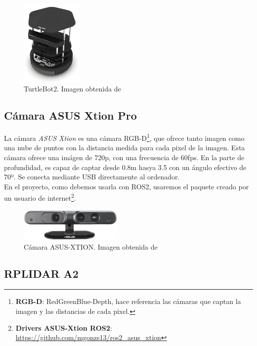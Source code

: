 \begin{figure} [H]
    \begin{center}
        \includegraphics[width=3cm]{figs/c3/turtlebot2_body.jpg}
    \end{center}
    \caption[TurtleBot2]{TurtleBot2. Imagen obtenida de \cite{turtlebot_2_structure}}
    \label{fig:turtlebot_2_structure}
\end{figure}

\subsection{Cámara ASUS Xtion Pro}
\label{subsec:asus_xtion}
La cámara \textit{ASUS Xtion} es una cámara RGB-D\footnote{\textbf{RGB-D}: RedGreenBlue-Depth, hace referencia las cámaras que captan la imagen y
las distancias de cada pixel.}, que ofrece tanto imagen como una nube de puntos con la distancia medida para cada pixel de la imagen.
Esta cámara ofrece una imágen de 720p, con una frecuencia de 60fps. En la parte de profundidad, es capaz de captar desde 0.8m hasya 3.5 con un
ángulo efectivo de 70º. Se conecta mediante USB directamente al ordenador.\\
En el proyecto, como debemos usarla con ROS2, usaremos el paquete creado por un usuario de
internet\footnote{\textbf{Drivers ASUS-Xtion ROS2}: \url{https://github.com/mgonzs13/ros2_asus_xtion}}.\\
\begin{figure} [H]
    \begin{center}
        \includegraphics[width=5cm]{figs/c3/asus_xtion.jpg}
    \end{center}
    \caption[Cámara ASUS-XTION]{Cámara ASUS-XTION. Imagen obtenida de \cite{asus_xtion}}
    \label{fig:asus_xtion}
\end{figure}

\subsection{RPLIDAR A2}
\label{subsec:rplidar_a2}

